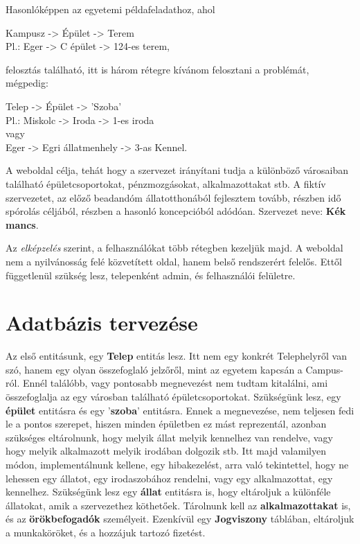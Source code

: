\documentclass[a4paper,12pt]{article}
\begin{document}
Hasonlóképpen az egyetemi példafeladathoz, ahol
\begin{center}
	Kampusz -> Épület -> Terem \\[0.5cm]
	Pl.: Eger -> C épület -> 124-es terem,
\end{center}
felosztás található, itt is három rétegre kívánom felosztani a problémát, mégpedig:
\begin{center}
	Telep -> Épület -> 'Szoba'\\[0.5cm]
	Pl.: Miskolc -> Iroda -> 1-es iroda\\
	vagy\\
	Eger -> Egri állatmenhely -> 3-as Kennel.
\end{center}

A weboldal célja, tehát hogy a szervezet irányítani tudja a különböző városaiban található épületcsoportokat, pénzmozgásokat, alkalmazottakat stb.
A fiktív szervezetet, az előző beadandóm állatotthonából fejlesztem tovább, részben idő spórolás céljából, részben a hasonló koncepcióból adódóan.
 Szervezet neve: \textbf{Kék mancs}.

Az \textit{elképzelés} szerint, a felhasználókat több rétegben kezeljük majd. A weboldal nem a nyilvánosság felé közvetített oldal, hanem belső rendszerért felelős. Ettől függetlenül szükség lesz, telepenként admin, és felhasználói felületre. 


\section{Adatbázis tervezése}

Az első entitásunk, egy \textbf{Telep} entitás lesz. Itt nem egy konkrét Telephelyről van szó, hanem egy olyan összefoglaló jelzőről, mint az egyetem kapcsán a Campus-ról. Ennél találóbb, vagy pontosabb megnevezést nem tudtam kitalálni, ami összefoglalja az egy városban található épületcsoportokat. Szükségünk lesz, egy \textbf{épület} entitásra és egy '\textbf{szoba}' entitásra. Ennek a megnevezése, nem teljesen fedi le a pontos szerepet, hiszen minden épületben ez mást reprezentál, azonban szükséges eltárolnunk, hogy melyik állat melyik kennelhez van rendelve, vagy hogy melyik alkalmazott melyik irodában dolgozik stb. Itt majd valamilyen módon, implementálnunk kellene, egy hibakezelést, arra való tekintettel, hogy ne lehessen egy állatot, egy irodaszobához rendelni, vagy egy alkalmazottat, egy kennelhez. Szükségünk lesz egy \textbf{állat} entitásra is, hogy eltároljuk a különféle állatokat, amik a szervezethez köthetőek. Tárolnunk kell az \textbf{alkalmazottakat} is, és az \textbf{örökbefogadók} személyeit. Ezenkívül egy \textbf{Jogviszony} táblában, eltároljuk a munkaköröket, és a hozzájuk tartozó fizetést.
\end{document}
